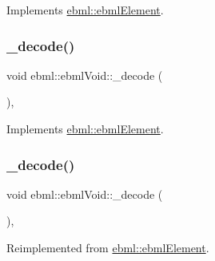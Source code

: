 Implements \mbox{\hyperlink{classebml_1_1ebmlElement_a3ebe3aa75b62971f385c01f27c807a02}{ebml\+::ebml\+Element}}.

\mbox{\label{classebml_1_1ebmlVoid_a4d5d56b3b45c18c5732a4e0d68762f87}} 
\subsubsection{\texorpdfstring{\+\_\+decode()}{\_decode()}\hspace{0.1cm}{\footnotesize\ttfamily [1/2]}}
{\footnotesize\ttfamily void ebml\+::ebml\+Void\+::\+\_\+decode (\begin{DoxyParamCaption}\item[{const \mbox{\hyperlink{classebml_1_1parseString}{parse\+String}} \&}]{ }\end{DoxyParamCaption})\hspace{0.3cm}{\ttfamily [protected]}, {\ttfamily [virtual]}}



Implements \mbox{\hyperlink{classebml_1_1ebmlElement_af7852c01970bf937f6787eac4843bdbd}{ebml\+::ebml\+Element}}.

\mbox{\label{classebml_1_1ebmlVoid_a3bf4c4cb979b33f513fd224329aee162}} 
\subsubsection{\texorpdfstring{\+\_\+decode()}{\_decode()}\hspace{0.1cm}{\footnotesize\ttfamily [2/2]}}
{\footnotesize\ttfamily void ebml\+::ebml\+Void\+::\+\_\+decode (\begin{DoxyParamCaption}\item[{const \mbox{\hyperlink{classebml_1_1parseFile}{parse\+File}} \&}]{ }\end{DoxyParamCaption})\hspace{0.3cm}{\ttfamily [protected]}, {\ttfamily [virtual]}}



Reimplemented from \mbox{\hyperlink{classebml_1_1ebmlElement_adf579591cece6b61d85cdb48861c3620}{ebml\+::ebml\+Element}}.


